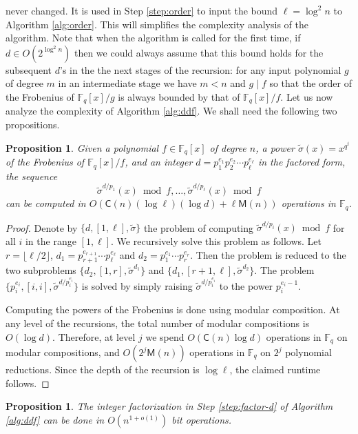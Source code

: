\documentclass{article}
\theoremstyle{plain}
\newtheorem{proposition}[theorem]{Proposition}
\theoremstyle{definition}
\def\F{\ensuremath{\mathbb{F}}}
\def\MM{\ensuremath{\mathsf{M}}}
\def\CC{\ensuremath{\mathsf{C}}}
\begin{document}
never changed. It is used in Step \ref{step:order} to input the bound $\ell = \log^2n$ to Algorithm 
\ref{alg:order}. This will simplifies the complexity analysis of the algorithm. Note that when the 
algorithm is called for the first time, if $d \in O(2^{\log^2n})$ then we could always assume that 
this bound holds for the subsequent $d$'s in the the next stages of the recursion: for any input 
polynomial $g$ of degree $m$ in an intermediate stage we have $m < n$ and $g \mid f$ so that the 
order of the Frobenius of $\F_q[x] / g$ is always bounded by that of $\F_q[x] / f$. Let us now 
analyze the complexity of Algorithm \ref{alg:ddf}. We shall need the following two propositions.
\begin{proposition}
	\label{prop:frobs}
	Given a polynomial $f \in \F_q[x]$ of degree $n$, a power $\tilde{\sigma}(x) = x^{q^t}$ of 
	the Frobenius of $\F_q[x] / f$, and an integer $d = p_1^{e_1} p_2^{e_2} \cdots p_\ell^{e_\ell}$ 
	in the factored form, the sequence
	\begin{equation}
	\label{equ:frobs}
		\tilde{\sigma}^{d / p_1}(x) \bmod f, \dots, \tilde{\sigma}^{d / p_\ell}(x) \bmod f
	\end{equation}
	can be computed in $O(\CC(n)(\log \ell)(\log d) + \ell\MM(n))$ operations in $\F_q$.
\end{proposition}
\begin{proof}
	Denote by $\{ d, [1, \ell], \tilde{\sigma} \}$ the problem of computing $\tilde{\sigma}^{d / 
	p_i}(x) \bmod f$ for all $i$ in the range $[1, \ell]$. We recursively solve this problem as 
	follows. Let $r = \lfloor \ell / 2 \rfloor$, $d_1 = p_{r + 1}^{e_{r + 1}} \cdots 
	p_\ell^{e_\ell}$ and $d_2 = p_1^{e_1} \cdots p_r^{e_r}$. Then the problem is reduced to the 
	two subproblems $\{ d_2, [1, r], \tilde{\sigma}^{d_1} \}$ and $\{ d_1, [r + 1, \ell], 
	\tilde{\sigma}^{d_2} \}$. The problem $\{ p_i^{e_i}, [i, i], \tilde{\sigma}^{d / p_i^{e_i}} \}$ 
	is solved by simply raising $\tilde{\sigma}^{d / p_i^{e_i}}$ to the power $p_i^{e_i - 1}$.
	
	Computing the powers of the Frobenius is done using modular composition. At any level of the 
	recursions, the total number of modular compositions is $O(\log d)$. Therefore, at level $j$ we 
	spend $O(\CC(n) \log d)$ operations in $\F_q$ on modular compositions, and $O(2^j\MM(n))$ 
	operations in $\F_q$ on $2^j$ polynomial reductions. Since the depth of the recursion is $\log 
	\ell$, the 	claimed runtime follows.
\end{proof}
\begin{proposition}
	\label{prop:factor-d}
	The integer factorization in Step \ref{step:factor-d} of Algorithm \ref{alg:ddf} can be done in 
	$O(n^{1 + o(1)})$ bit operations.
\end{proposition}
\end{document}
